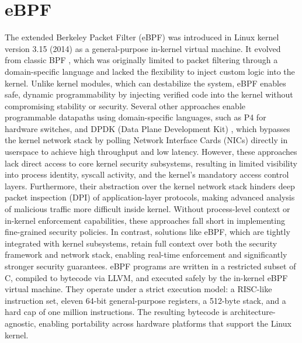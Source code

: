 \documentclass [11pt, proquest] {uwthesis}[2020/02/24]
\begin{document}
\section{eBPF}
The extended Berkeley Packet Filter (eBPF) was introduced in Linux kernel version 3.15 (2014) as a general-purpose in-kernel virtual machine. It evolved from classic BPF \cite{10.5555/1267303.1267305}, which was originally limited to packet filtering through a domain-specific language and lacked the flexibility to inject custom logic into the kernel.
Unlike kernel modules, which can destabilize the system, eBPF enables safe, dynamic programmability by injecting verified code into the kernel without compromising stability or security. Several other approaches enable programmable datapaths using domain-specific languages, such as P4 \cite{bosshart2014p4} for hardware switches, and DPDK (Data Plane Development Kit) \cite{8701793}, which bypasses the kernel network stack by polling Network Interface Cards (NICs) directly in userspace to achieve high throughput and low latency. However, these approaches lack direct access to core kernel security subsystems, resulting in limited visibility into process identity, syscall activity, and the kernel’s mandatory access control layers. Furthermore, their abstraction over the kernel network stack hinders deep packet inspection (DPI) of application-layer protocols, making advanced analysis of malicious traffic more difficult inside kernel. Without process-level context or in-kernel enforcement capabilities, these approaches fall short in implementing fine-grained security policies. In contrast, solutions like eBPF, which are tightly integrated with kernel subsystems, retain full context over both the security framework and network stack, enabling real-time enforcement and significantly stronger security guarantees. eBPF programs are written in a restricted subset of C, compiled to bytecode via LLVM, and executed safely by the in-kernel eBPF virtual machine. They operate under a strict execution model: a RISC-like instruction set, eleven 64-bit general-purpose registers, a 512-byte stack, and a hard cap of one million instructions. The resulting bytecode is architecture-agnostic, enabling portability across hardware platforms that support the Linux kernel.
\end{document}
